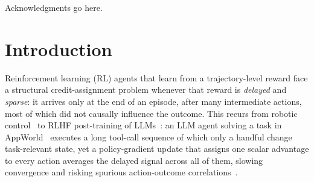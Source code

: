\begin{abstract}
  Taken together, the watch-repair result supports the dissertation's central claim, that explicitly identifying and weighting the causally relevant steps of a trajectory is a more sample-efficient credit-assignment strategy than either an undifferentiated trajectory-level baseline or a learned return-redistribution network, and the AppWorld result is consistent with the same claim on an exact, single-seed comparison, though it has not been tested for statistical significance across multiple seeds in the way the tabular result has.

\end{abstract}%
\clearpage



\begin{uomoriginality}
  \uomoriginalitydeclaration
\end{uomoriginality}
\uomcopyrightstatement


\begin{uomacknowledgements}
  Acknowledgments go here.
\end{uomacknowledgements}


\uomstartmainbody %


\section{Introduction}
\label{sec:introduction}

Reinforcement learning (RL) agents that learn from a trajectory-level reward face a structural credit-assignment problem whenever that reward is \emph{delayed} and \emph{sparse}: it arrives only at the end of an episode, after many intermediate actions, most of which did not causally influence the outcome. This recurs from robotic control~\cite{lillicrap2016ddpg,silver2017alphazero} to RLHF post-training of LLMs~\cite{christiano2017rlhf,bai2022hhrlhf,ouyang2022instructgpt}: an LLM agent solving a task in AppWorld~\cite{trivedi2024appworld} executes a long tool-call sequence of which only a handful change task-relevant state, yet a policy-gradient update that assigns one scalar advantage to every action averages the delayed signal across all of them, slowing convergence and risking spurious action-outcome correlations~\cite{amodei2016concrete,chang2020invariant}.

